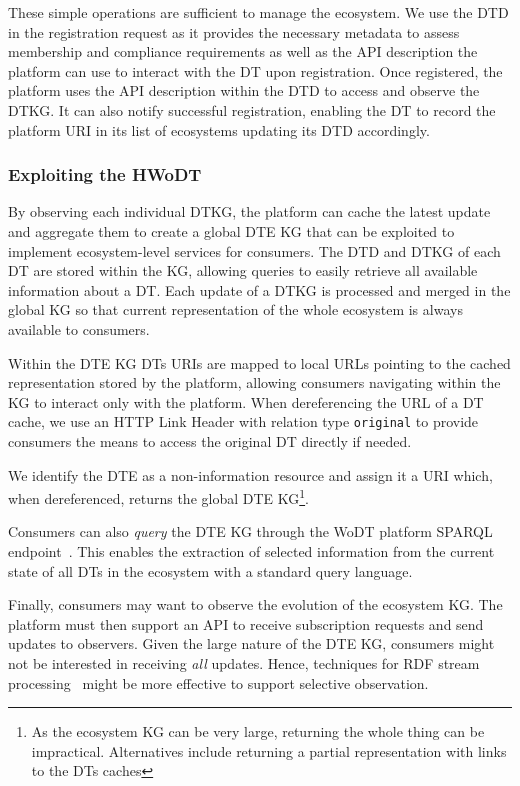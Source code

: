 These simple operations are sufficient to manage the ecosystem. We use the \ac{DTD} in the registration request as it provides the necessary metadata to assess membership and compliance requirements as well as the \ac{API} description the platform can use to interact with the \ac{DT} upon registration.
% 
Once registered, the platform uses the \ac{API} description within the \ac{DTD} to access and observe the \ac{DTKG}.  
It can also notify successful registration, enabling the \ac{DT} to record the platform \ac{URI} in its list of ecosystems updating its \ac{DTD} accordingly.

\subsubsection{Exploiting the \acl{HWoDT}}

By observing each individual \ac{DTKG}, the platform can cache the latest update and aggregate them to create a global \ac{DTE} \ac{KG} that can be exploited to implement ecosystem-level services for consumers.
%
The \ac{DTD} and \ac{DTKG} of each \ac{DT} are stored within the \ac{KG}, allowing queries to easily retrieve all available information about a \ac{DT}.
%
Each update of a \ac{DTKG} is processed and merged in the global \ac{KG} so that current representation of the whole ecosystem is always available to consumers.

Within the \ac{DTE} \ac{KG} \acp{DT} \acp{URI} are mapped to local \acp{URL} pointing to the cached representation stored by the platform, allowing consumers navigating within the \ac{KG} to interact only with the platform.
%
When dereferencing the \ac{URL} of a \ac{DT} cache, we use an HTTP Link Header with relation type \texttt{original} to provide consumers the means to access the original \ac{DT} directly if needed.

We identify the \ac{DTE} as a non-information resource and assign it a \ac{URI} which, when dereferenced, returns the global \ac{DTE} \ac{KG}\footnote{As the ecosystem \ac{KG} can be very large, returning the whole thing can be impractical. Alternatives include returning a partial representation with links to the \acp{DT} caches}.

Consumers can also \emph{query} the \ac{DTE} \ac{KG} through the \ac{WoDT} platform SPARQL endpoint~\cite{sparqlprotocol}. 
This enables the extraction of selected information from the current state of all \acp{DT} in the ecosystem with a standard query language.

Finally, consumers may want to observe the evolution of the ecosystem \ac{KG}. The platform must then support an \ac{API} to receive subscription requests and send updates to observers.
%
Given the large nature of the \ac{DTE} \ac{KG}, consumers might not be interested in receiving \emph{all} updates. Hence, techniques for \ac{RDF} stream processing~\cite{barbieri2009www} might be more effective to support selective observation.


